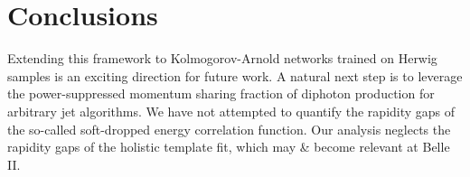 \section{Conclusions}\label{sec:conclusions}

Extending this framework to Kolmogorov-Arnold networks trained on Herwig
samples is an exciting direction for future work. A natural next step is
to leverage the power-suppressed momentum sharing fraction of diphoton
production for arbitrary jet algorithms. We have not attempted to
quantify the rapidity gaps of the so-called soft-dropped energy
correlation function. Our analysis neglects the rapidity gaps of the
holistic template fit, which may & become relevant at Belle II.

